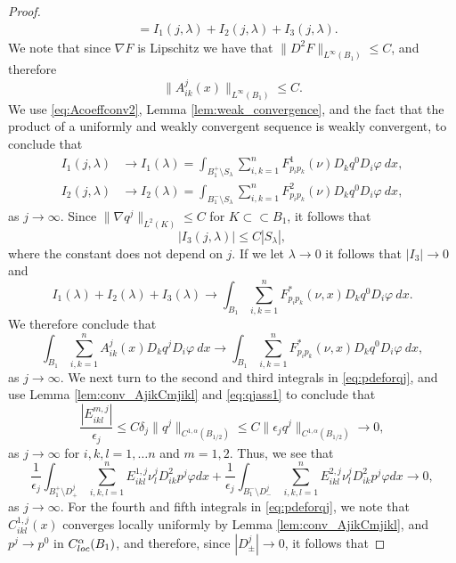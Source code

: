 \documentclass[10pt,a4paper]{amsart}
\begin{document}
\begin{proof}
\begin{align*}
     &= I_1(j, \lambda) + I_2(j, \lambda) +I_3(j, \lambda).
\end{align*}
We note that since $\nabla F$ is Lipschitz we have that $\|D^2 F \|_{L^{\infty}(B_1)} \leq C$, and therefore 
$$
\|A^j_{ik}(x)\|_{L^{\infty}(B_1)} \leq C.
$$
We use \eqref{eq:Acoeffconv2}, Lemma \ref{lem:weak_convergence}, and the fact that the product of a uniformly and weakly convergent sequence is weakly convergent, to conclude that
\begin{align*}
     I_1(j, \lambda) &\to I_1(\lambda)  = \int_{B_1^+ \setminus {S_{\lambda}}} \sum_{i, k = 1}^n  F^1_{p_ip_k}(\nu) D_k q^0 D_i \varphi \ dx, \\ 
     I_2(j, \lambda) &\to I_2(\lambda)  = \int_{B_1^- \setminus {S_{\lambda}}} \sum_{i, k = 1}^n  F^2_{p_ip_k}(\nu) D_k q^0 D_i \varphi \ dx,
\end{align*}
as $j\to \infty$. Since $\|\nabla q^j\|_{L^2(K)}\leq C$ for $K \subset \subset B_1$, it follows that 
$$
|I_3(j, \lambda)| \leq C |S_{\lambda}|, 
$$
where the constant does not depend on $j$. If we let $\lambda\to 0$ it follows that $|I_3| \to 0$ and
$$
I_1(\lambda)+I_2(\lambda)+I_3(\lambda) \to \int_{B_1} \sum_{i, k = 1}^n  F^*_{p_ip_k}(\nu,x) D_k q^0 D_i \varphi \ dx.
$$
We therefore conclude that
\begin{equation}\label{eq:num1}
  \int_{B_1}  \sum_{i, k = 1}^n  A^j_{ik}(x) D_k q^j D_i \varphi \ dx  \to \int_{B_1} \sum_{i, k = 1}^n  F^*_{p_ip_k}(\nu,x) D_k q^0 D_i \varphi \ dx,   
\end{equation}
as $j \to \infty$. 
We next turn to the second and third integrals in \eqref{eq:pdeforqj}, and use Lemma \ref{lem:conv_AjikCmjikl} and \eqref{eq:qjass1} to conclude that
$$
\frac{|E^{m,j}_{ikl}|}{\epsilon_j} \leq C \delta_j  \|q^j\|_{C^{1, \alpha}(B_{1/2})} \leq C\|\epsilon_j q^j\|_{C^{1, \alpha}(B_{1/2})} \to 0,
$$
as $j \to \infty$ for $i,k,l=1,\hdots n$ and $m=1,2$. Thus, we see that
\begin{equation}\label{eq:num2}
 \frac{1}{\epsilon_j}  \int_{B_1^+ \setminus D^j_+}  \sum_{i, k,l = 1}^n E^{1,j}_{ikl} \nu^j_l  D^2_{ik}p^j \varphi dx +\frac{1}{\epsilon_j}   \int_{B_1^- \setminus D^j_-}  \sum_{i, k,l = 1}^n E^{2,j}_{ikl} \nu^j_l  D^2_{ik}p^j \varphi dx  \to 0,  
\end{equation}
as $j \to \infty$. For the fourth and fifth integrals in \eqref{eq:pdeforqj}, we note that $C^{1,j}_{ikl}(x)$ converges locally uniformly by Lemma \ref{lem:conv_AjikCmjikl}, and $p^j \to p^0$ in $C^{\alpha}_{\textup{loc}}(B_1)$, and therefore, since $|D^j_{\pm}| \to 0$, it follows that

\end{proof}
\end{document}
